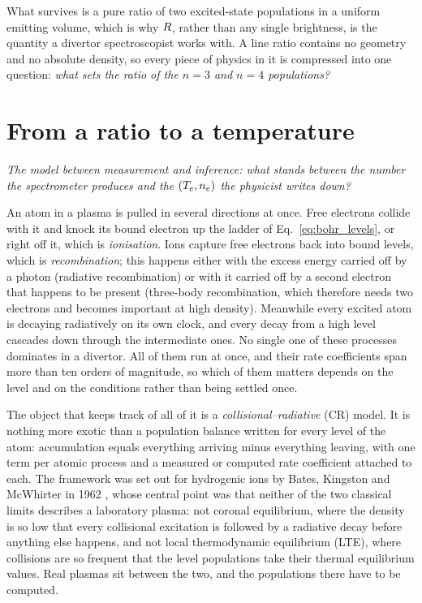 What survives is a pure ratio of two excited-state populations in a uniform
emitting volume, which is why
$R$, rather than any single brightness, is the quantity a divertor
spectroscopist works with. A line ratio contains no geometry and no absolute
density, so every piece of physics in it is compressed into one question:
\emph{what sets the ratio of the $n=3$ and $n=4$ populations?}

\section{From a ratio to a temperature}
\label{sec:inversion}

\emph{The model between measurement and inference: what stands between the number the spectrometer produces and
the $(T_e,n_e)$ the physicist writes down?}

An atom in a plasma is pulled in several directions at once. Free electrons
collide with it and knock its bound electron up the ladder of
Eq.~\eqref{eq:bohr_levels}, or right off it, which is \emph{ionisation}. Ions
capture free electrons back into bound levels, which is \emph{recombination};
this happens either with the excess energy carried off by a photon (radiative
recombination) or with it carried off by a second electron that happens to be
present (three-body recombination, which therefore needs two electrons and
becomes important at high density). Meanwhile every excited atom is decaying
radiatively on its own clock, and every decay from a high level cascades down
through the intermediate ones. No single one of these processes dominates in a
divertor. All of them run at once, and their rate coefficients span more than
ten orders of magnitude, so which of them matters depends on the level and on
the conditions rather than being settled once.

The object that keeps track of all of it is a \emph{collisional--radiative} (CR)
model. It is nothing more exotic than a population balance written for every
level of the atom: accumulation equals everything arriving minus everything
leaving, with one term per atomic process and a measured or computed rate
coefficient attached to each. The framework was set out for hydrogenic ions by
Bates, Kingston and McWhirter in 1962 \cite{Bates1962}, whose central point was
that neither of the two classical limits describes a laboratory plasma: not
coronal equilibrium, where the density is so low that every collisional
excitation is followed by a radiative decay before anything else happens, and not
local thermodynamic equilibrium (LTE), where collisions are so frequent that the
level populations take their thermal equilibrium values. Real plasmas sit between
the two, and the populations there have to be computed.

